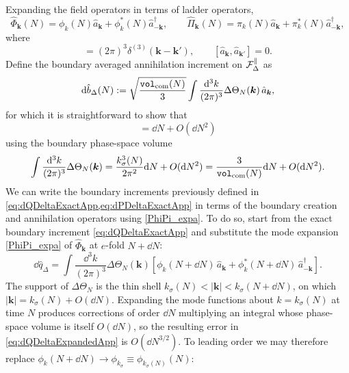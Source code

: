 \documentclass{article}
\def\cF{{\cal F}}
\newcommand{\VF}{\mathtt{vol}_{\rm com}}
\newcommand{\hvarphi}{\hat{\Phi}}
\newcommand{\hpi}{\hat{\Pi}}
\numberwithin{equation}{section}
\begin{document}
	Expanding the field operators in terms of ladder operators,
	\begin{equation}
		\label{PhiPi_expa}
		\hvarphi_{{\bm k}}(N) = \phi_{k}(N) \hat a_{{\bm k}} + \phi^{\ast}_{k}(N) \hat a_{-{\bm k}}^{\dagger}, \qquad \hpi_{{\bm k}}(N) = \pi_{k}(N) \hat a_{{\bm k}} + \pi^{\ast}_{k}(N) \hat a_{-{\bm k}}^{\dagger},
	\end{equation}
	where
	\begin{equation}
		[\hat a_{{\bm k}}, \hat a_{{\bm k}'}^{\dagger}] = (2\pi)^3 \delta^{(3)}({\bm k} - {\bm k}'), \qquad [\hat a_{{\bm k}}, \hat a_{{\bm k}'}] = 0 .
	\end{equation}
	Define the boundary averaged annihilation increment on \(\cF_{\Delta}^\parallel\) as
	\begin{equation}
		\dd\hat b_\Delta(N) := \sqrt{\frac{\VF(N)}{3}} \int \frac{\dd^3k}{(2\pi)^3} \Delta\Theta_N(\bm k)\,\hat a_{\bm k},
		\label{eq:dbDeltaDefApp}
	\end{equation}
	for which it is straightforward to show that
	\begin{equation}
		[\dd\hat b_\Delta(N),\dd\hat b^{\dagger}_\Delta(N)] = \dd N+ O(\dd N^2)
	\end{equation}
	using the boundary phase-space volume
	\begin{equation}
		\int \frac{\dd^3k}{(2\pi)^3} \Delta\Theta_N(\bm k) = \frac{k_\sigma^3(N)}{2\pi^2}\dd N + O(\dd N^2) = \frac{3}{\VF(N)}\dd N + O(\dd N^2).
	\end{equation}
	We can write the boundary increments previously defined in \cref{eq:dQDeltaExactApp,eq:dPDeltaExactApp} in terms of the boundary creation and annihilation operators using \cref{PhiPi_expa}. To do so, start from the exact boundary increment \cref{eq:dQDeltaExactApp} and substitute the mode expansion \cref{PhiPi_expa} of \(\hvarphi_{\bm k}\) at $e$-fold \(N+\dd N\):
	\begin{equation}
		\dd\hat q_{\Delta} = \int\frac{\dd^3k}{(2\pi)^3} \Delta\Theta_N(\bm k) \left[ \phi_k(N+\dd N)\,\hat a_{\bm k} + \phi^*_k(N+\dd N)\,\hat a^\dagger_{-\bm k} \right].
		\label{eq:dQDeltaExpandedApp}
	\end{equation}
	The support of \(\Delta\Theta_N\) is the thin shell \(k_\sigma(N)<|\bm k|<k_\sigma(N+\dd N)\), on which \(|\bm k|=k_\sigma(N)+O(\dd N)\). Expanding the mode functions about \(k=k_\sigma(N)\) at time \(N\) produces corrections of order \(\dd N\) multiplying an integral whose phase-space volume is itself \(O(\dd N)\), so the resulting error in \cref{eq:dQDeltaExpandedApp} is \(O(\dd N^{3/2})\). To leading order we may therefore replace \(\phi_k(N+\dd N)\to\phi_{k_\sigma}\equiv\phi_{k_\sigma(N)}(N)\):
\end{document}
